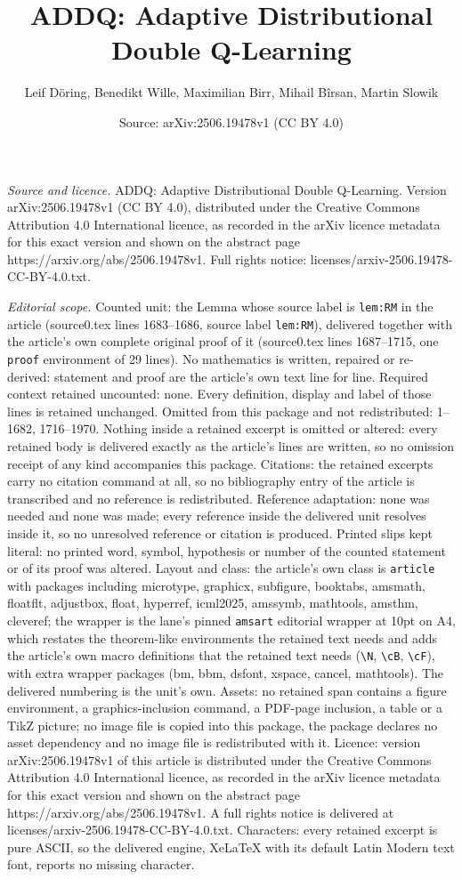 \documentclass[10pt,a4paper]{amsart}
\title[ADDQ: Adaptive Distributional Double Q-Learning]{ADDQ: Adaptive Distributional Double Q-Learning}
\author{Leif D\"oring, Benedikt Wille, Maximilian Birr, Mihail B\^irsan, Martin Slowik}
\date{Source: arXiv:2506.19478v1 (CC BY 4.0)}
\begin{document}
\maketitle

\noindent\emph{Source and licence.} ADDQ: Adaptive Distributional Double Q-Learning. Version arXiv:2506.19478v1 (CC BY 4.0), distributed under the Creative Commons Attribution 4.0 International licence, as recorded in the arXiv licence metadata for this exact version and shown on the abstract page https://arxiv.org/abs/2506.19478v1. Full rights notice: licenses/arxiv-2506.19478-CC-BY-4.0.txt.\par\smallskip

\noindent\textit{Editorial scope.} Counted unit: the Lemma whose source label is \texttt{lem:RM} in the article (source0.tex lines 1683--1686, source label \texttt{lem:RM}), delivered together with the article's own complete original proof of it (source0.tex lines 1687--1715, one \texttt{proof} environment of 29 lines). No mathematics is written, repaired or re-derived: statement and proof are the article's own text line for line. Required context retained uncounted: none. Every definition, display and label of those lines is retained unchanged. Omitted from this package and not redistributed: 1--1682, 1716--1970. Nothing inside a retained excerpt is omitted or altered: every retained body is delivered exactly as the article's lines are written, so no omission receipt of any kind accompanies this package. Citations: the retained excerpts carry no citation command at all, so no bibliography entry of the article is transcribed and no reference is redistributed. Reference adaptation: none was needed and none was made; every reference inside the delivered unit resolves inside it, so no unresolved reference or citation is produced. Printed slips kept literal: no printed word, symbol, hypothesis or number of the counted statement or of its proof was altered. Layout and class: the article's own class is \texttt{article} with packages including microtype, graphicx, subfigure, booktabs, amsmath, floatflt, adjustbox, float, hyperref, icml2025, amssymb, mathtools, amsthm, cleveref; the wrapper is the lane's pinned \texttt{amsart} editorial wrapper at 10pt on A4, which restates the theorem-like environments the retained text needs and adds the article's own macro definitions that the retained text needs (\texttt{\textbackslash N}, \texttt{\textbackslash cB}, \texttt{\textbackslash cF}), with extra wrapper packages (bm, bbm, dsfont, xspace, cancel, mathtools). The delivered numbering is the unit's own. Assets: no retained span contains a figure environment, a graphics-inclusion command, a PDF-page inclusion, a table or a TikZ picture; no image file is copied into this package, the package declares no asset dependency and no image file is redistributed with it. Licence: version arXiv:2506.19478v1 of this article is distributed under the Creative Commons Attribution 4.0 International licence, as recorded in the arXiv licence metadata for this exact version and shown on the abstract page https://arxiv.org/abs/2506.19478v1. A full rights notice is delivered at licenses/arxiv-2506.19478-CC-BY-4.0.txt. Characters: every retained excerpt is pure ASCII, so the delivered engine, XeLaTeX with its default Latin Modern text font, reports no missing character.
\end{document}
